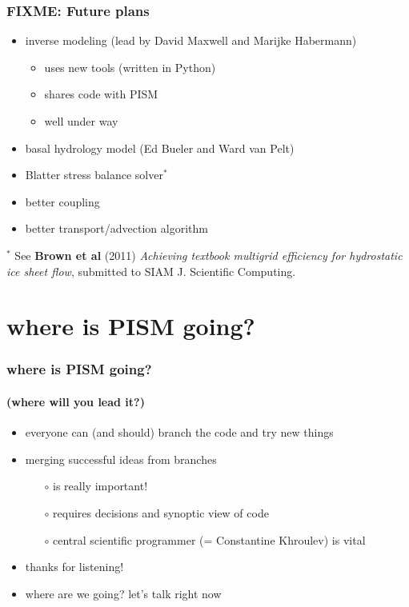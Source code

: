 \documentclass[hide notes,intlimits]{beamer}
\begin{document}
\begin{frame}
  \frametitle{FIXME: Future plans}
  \begin{itemize}
  \item inverse modeling (lead by David Maxwell and Marijke Habermann)
    \begin{itemize}
    \item uses new tools (written in Python)
    \item shares code with PISM
    \item well under way
    \end{itemize}
  \item basal hydrology model (Ed Bueler and Ward van Pelt)
  \item Blatter stress balance solver$^{*}$
  \item better coupling
  \item better transport/advection algorithm
  \end{itemize}

 \begin{flushleft}
   \tiny
    $^{*}$ See \textbf{Brown et al} (2011)
    \emph{Achieving textbook multigrid efficiency for hydrostatic ice sheet
      flow}, submitted to SIAM J. Scientific Computing.
  \end{flushleft}
\end{frame}


\section[where to?]{where is PISM going?}

\begin{frame}
  \frametitle{where is PISM going?}
  \framesubtitle{(where will you lead it?)}

\begin{itemize}
  \item everyone can (and should) branch the code and try new things
  \item merging successful ideas from branches
    \begin{itemize}
    \item[$\circ$] is really important!
    \item[$\circ$] requires decisions and synoptic view of code
    \item[$\circ$] central scientific programmer (= Constantine Khroulev) is vital
    \end{itemize}
  \item \alert{thanks for listening!}

\bigskip\bigskip

  \item where are we going?  let's talk right now
\end{itemize}

\end{frame}
\end{document}

